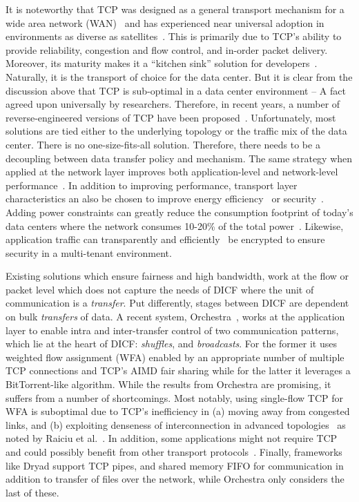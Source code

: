 \documentclass[a4paper,12pt,twoside,openright]{report}
\begin{document}
It is noteworthy that TCP was designed as a general transport mechanism for a
wide area network (WAN)~\cite{Clark:1988:DPD} and has experienced near universal
adoption in environments as diverse as satellites~\cite{Henderson:1999:TPF}.
This is primarily due to TCP's ability to provide reliability, congestion and
flow control, and in-order packet delivery.
Moreover, its maturity makes it a ``kitchen sink'' solution for
developers~\cite{Vasudevan:2009:SEF}. Naturally, it is the transport of choice
for the data center. But it is clear from the discussion above that TCP is
sub-optimal in a data center environment -- A fact agreed upon universally by
researchers. Therefore, in recent years, a number of reverse-engineered versions
of TCP have been
proposed~\cite{Alizadeh:2010:DCT,Wu:2010:IIC,Wilson:2011:BNL,Vasudevan:2009:SEF,Chen:2009:UTI}.
Unfortunately, most solutions are tied either to the underlying topology or the
traffic mix of the data center. There is no one-size-fits-all solution.
Therefore, there needs to be a decoupling between data transfer policy and
mechanism. The same strategy when applied at the network layer improves both
application-level and network-level performance~\cite{Abu-Libdeh:2010:SRF}. In
addition to improving performance, transport layer characteristics an also be
chosen to improve energy efficiency~\cite{Heller:2010:ESE} or
security~\cite{bittau:the}. Adding power constraints can greatly reduce the
consumption footprint of today's data centers where the network consumes 10-20\%
of the total power~\cite{Greenberg:2008:CCR}.
Likewise, application traffic can transparently and
efficiently~\cite{bittau:the} be encrypted to ensure security in a multi-tenant
environment.

Existing solutions which ensure fairness and high bandwidth, work at the flow or
packet level which does not capture the needs of DICF where the unit of
communication is a \emph{transfer}.
Put differently, stages between DICF are dependent on bulk \emph{transfers} of
data. A recent system, Orchestra~\cite{Chowdhury:2011:MDT}, works at the
application layer to enable intra and inter-transfer control of two
communication patterns, which lie at the heart of DICF: \emph{shuffles}, and
\emph{broadcasts}. For the former it uses weighted flow assignment (WFA) enabled
by an appropriate number of multiple TCP connections and TCP's AIMD fair sharing
while for the latter it leverages a BitTorrent-like algorithm. While the results
from Orchestra are promising, it suffers from a number of shortcomings. Most
notably, using single-flow TCP for WFA is suboptimal due to TCP's inefficiency
in (a) moving away from congested links, and (b) exploiting denseness of
interconnection in advanced
topologies~\cite{Al-Fares:2008:SCD,Guo:2008:DSF,Guo:2009:BHP,Greenberg:2009:VSF}
as noted by Raiciu et al.~\cite{Raiciu:2011:IDP}. In addition, some applications
might not require TCP and could possibly benefit from other transport
protocols~\cite{bittau:the,Alizadeh:2010:DCT,Vasudevan:2009:SEF,Raiciu:2010:DCN,Wilson:2011:BNL}.
Finally, frameworks like Dryad support TCP pipes, and shared memory FIFO for
communication in addition to transfer of files over the network, while Orchestra
only considers the last of these.
\end{document}
